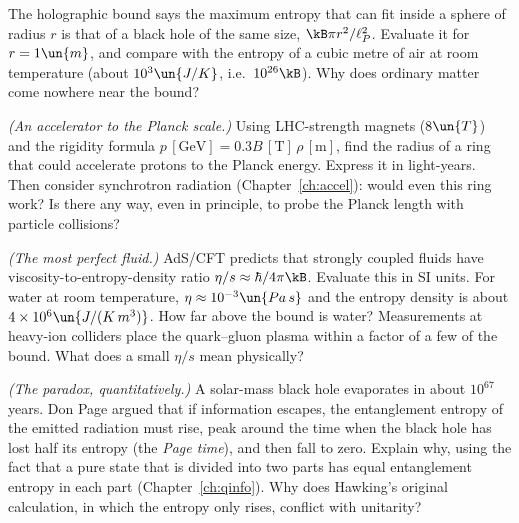 \begin{problems}
 The holographic bound says the maximum entropy that can fit inside a sphere of radius $r$ is that of a black hole of the same size, $\kB\pi r^2/\ell_P^2$. Evaluate it for $r = 1\un{m}$, and compare with the entropy of a cubic metre of air at room temperature (about $10^{3}\un{J/K}$, i.e.\ $10^{26}\kB$). Why does ordinary matter come nowhere near the bound?

\core \label{prob:planck-accelerator} \emph{(An accelerator to the Planck scale.)} Using LHC-strength magnets ($8\un{T}$) and the rigidity formula $p\,[\mathrm{GeV}] = 0.3B\,[\mathrm{T}]\,\rho\,[\mathrm{m}]$, find the radius of a ring that could accelerate protons to the Planck energy. Express it in light-years. Then consider synchrotron radiation (Chapter~\ref{ch:accel}): would even this ring work? Is there any way, even in principle, to probe the Planck length with particle collisions?

 \label{prob:viscosity} \emph{(The most perfect fluid.)} AdS/CFT predicts that strongly coupled fluids have viscosity-to-entropy-density ratio $\eta/s\approx\hbar/4\pi\kB$. Evaluate this in SI units. For water at room temperature, $\eta\approx10^{-3}\un{Pa\,s}$ and the entropy density is about $4\times10^{6}\un{J/(K\,m^3)}$. How far above the bound is water? Measurements at heavy-ion colliders place the quark--gluon plasma within a factor of a few of the bound. What does a small $\eta/s$ mean physically?

 \emph{(The paradox, quantitatively.)} A solar-mass black hole evaporates in about $10^{67}$ years. Don Page argued that if information escapes, the entanglement entropy of the emitted radiation must rise, peak around the time when the black hole has lost half its entropy (the \emph{Page time}), and then fall to zero. Explain why, using the fact that a pure state that is divided into two parts has equal entanglement entropy in each part (Chapter~\ref{ch:qinfo}). Why does Hawking's original calculation, in which the entropy only rises, conflict with unitarity?
\end{problems}

\begin{reading}
\end{reading}
